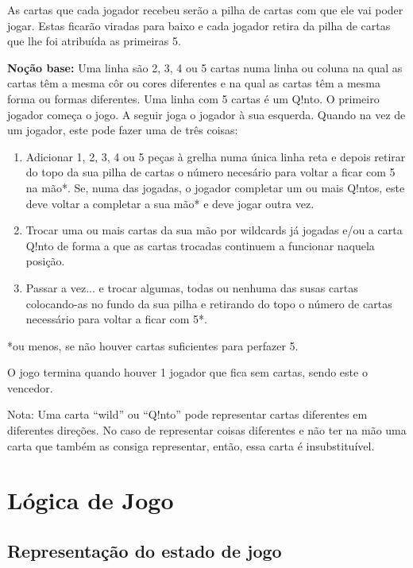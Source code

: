 \documentclass[a4paper]{article}
\begin{document}
	As cartas que cada jogador recebeu serão a pilha de cartas com que ele vai poder jogar. Estas ficarão viradas para baixo e cada jogador retira da pilha de cartas que lhe foi atribuída as primeiras 5. 
	
	\textbf{Noção base:} Uma linha são 2, 3, 4 ou 5 cartas numa linha ou coluna na qual as cartas têm a mesma côr ou cores diferentes e na qual as cartas têm a mesma forma ou formas diferentes. Uma linha com 5 cartas é um Q!nto.
	O primeiro jogador começa o jogo. A seguir joga o jogador à sua esquerda. Quando na vez de um jogador, este pode fazer uma de três coisas:
	
	\begin{enumerate}
	\item 		Adicionar 1, 2, 3, 4 ou 5 peças à grelha numa única linha reta e depois retirar do topo da sua pilha de cartas o número necesário para voltar a ficar com 5 na mão*.
	Se, numa das jogadas, o jogador completar um ou mais Q!ntos, este deve voltar a completar a sua mão* e deve jogar outra vez.
	\item		Trocar uma ou mais cartas da sua mão por wildcards já jogadas e/ou a carta Q!nto de forma a que as cartas trocadas continuem a funcionar naquela posição.
	\item		Passar a vez... e trocar algumas, todas ou nenhuma das susas cartas colocando-as no fundo da sua pilha e retirando do topo o número de cartas necessário para voltar a ficar com 5*.
	\end{enumerate}
	
	\small
	*ou menos, se não houver cartas suficientes para perfazer 5.
	\normalsize
	
	\bigskip
	
	O jogo termina quando houver 1 jogador que fica sem cartas, sendo este o vencedor.\newline
	
	\small
	\noindent
	Nota: Uma carta “wild” ou “Q!nto” pode representar cartas diferentes em diferentes direções. No caso de representar coisas diferentes e não ter na mão uma carta que também as consiga representar, então, essa carta é insubstituível.
	\normalsize
	\newpage

	\section{Lógica de Jogo}
	\subsection{Representação do estado de jogo}
\end{document}
